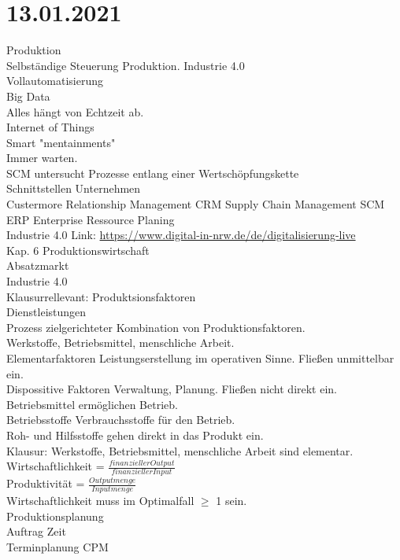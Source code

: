 \documentclass{article}
\begin{document}
	\section*{13.01.2021}
	Produktion \\
	Selbständige Steuerung Produktion. Industrie 4.0 \\
	Vollautomatisierung \\
	Big Data \\
	Alles hängt von Echtzeit ab. \\
	Internet of Things \\
	Smart "mentainments" \\
	Immer warten. \\
	SCM untersucht Prozesse entlang einer Wertschöpfungskette \\
	Schnittstellen Unternehmen \\
	Custermore Relationship Management CRM
	Supply Chain Management SCM \\
	ERP Enterprise Ressource Planing \\
	Industrie 4.0 Link: \url{https://www.digital-in-nrw.de/de/digitalisierung-live} \\
	Kap. 6 Produktionswirtschaft \\
	Absatzmarkt \\
	Industrie 4.0 \\
	Klausurrellevant: Produktsionsfaktoren \\
	Dienstleistungen \\
	Prozess zielgerichteter Kombination von Produktionsfaktoren. \\
	Werkstoffe, Betriebsmittel, menschliche Arbeit. \\
	Elementarfaktoren Leistungserstellung im operativen Sinne. Fließen unmittelbar ein. \\
	Dispossitive Faktoren Verwaltung, Planung. Fließen nicht direkt ein. \\
	Betriebsmittel ermöglichen Betrieb. \\
	Betriebsstoffe Verbrauchsstoffe für den Betrieb. \\
	Roh- und Hilfsstoffe gehen direkt in das Produkt ein. \\
	Klausur: Werkstoffe, Betriebsmittel, menschliche Arbeit sind elementar. \\
	Wirtschaftlichkeit = $\frac{finanzieller Output}{finanzieller Input}$ \\
	Produktivität  = $\frac{Outputmenge}{Inputmenge}$ \\
	Wirtschaftlichkeit muss im Optimalfall $\geq$ 1 sein. \\
	Produktionsplanung \\
	Auftrag Zeit  \\
	Terminplanung CPM \\
\end{document}
